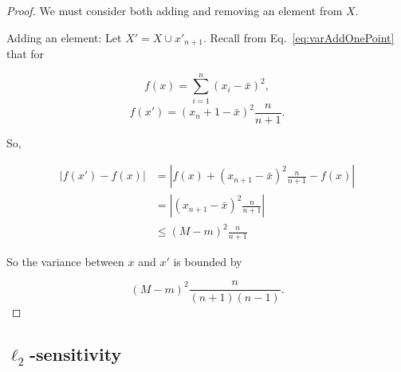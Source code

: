 \documentclass[11pt]{scrartcl} %
\begin{document}
 \begin{proof}
 	We must consider both adding and removing an element from $X$. \newline

 	Adding an element: \newline
 	Let $X' = X \cup x'_{n+1}$. Recall from Eq.~\ref{eq:varAddOnePoint} that for 
	
	$$ f(x) = \sum_{i=1}^n (x_i - \bar{x})^2, $$
	$$ f(x') = (x_n+1 - \bar{x})^2 \frac{n}{n+1}.$$ 
	
	So,
	
	\begin{align*}
	\left\vert f(x') - f(x) \right\vert &= \left\vert f(x) + (x_{n+1} - \bar{x})^2 \frac{n}{n+1} - f(x) \right\vert \\
		&= \left\vert (x_{n+1} - \bar{x})^2 \frac{n}{n+1} \right\vert \\
		&\le \left( M-m \right)^2 \frac{n}{n+1}
	\end{align*}
	
	So the variance between $x$ and $x'$ is bounded by
	
	$$ \left( M-m \right)^2 \frac{n}{(n+1)(n-1)}.$$ 
 \end{proof}

\subsection{$\ell_2$-sensitivity}



\end{document}
